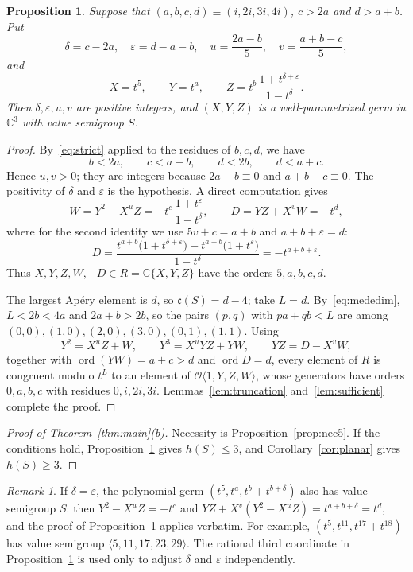 \documentclass{amsart}
\newtheorem{proposition}[theorem]{Proposition}
\theoremstyle{definition}
\theoremstyle{remark}
\newtheorem{remark}[theorem]{Remark}
\numberwithin{equation}{section}
\newcommand{\C}{\mathbb{C}}
\newcommand{\cO}{\mathcal{O}}
\newcommand{\ord}{\operatorname{ord}}
\newcommand{\cond}{\mathfrak{c}}
\newcommand{\gen}[1]{\langle #1\rangle}
\newcommand{\Os}[1]{\cO\langle #1\rangle}
\begin{document}
\begin{proposition}\label{prop:real5}
Suppose that $(a,b,c,d)\equiv(i,2i,3i,4i)$, $c>2a$ and $d>a+b$. Put
\[
\delta=c-2a,\quad \varepsilon=d-a-b,\quad u=\frac{2a-b}{5},\quad v=\frac{a+b-c}{5},
\]
and
\[
X=t^5,\qquad Y=t^a,\qquad Z=t^b\,\frac{1+t^{\delta+\varepsilon}}{1-t^\delta}.
\]
Then $\delta,\varepsilon,u,v$ are positive integers, and $(X,Y,Z)$ is a well-parametrized germ in $\C^3$ with value semigroup $S$.
\end{proposition}

\begin{proof}
By~\eqref{eq:strict} applied to the residues of $b,c,d$, we have
\begin{equation}\label{eq:mededim}
b<2a,\qquad c<a+b,\qquad d<2b,\qquad d<a+c.
\end{equation}
Hence $u,v>0$; they are integers because $2a-b\equiv0$ and $a+b-c\equiv0$. The positivity of $\delta$ and $\varepsilon$ is the hypothesis. A direct computation gives
\begin{equation}\label{eq:ident5}
W=Y^2-X^uZ=-t^c\,\frac{1+t^\varepsilon}{1-t^\delta},\qquad D=YZ+X^vW=-t^d,
\end{equation}
where for the second identity we use $5v+c=a+b$ and $a+b+\varepsilon=d$:
\[
D=\frac{t^{a+b}\bigl(1+t^{\delta+\varepsilon}\bigr)-t^{a+b}\bigl(1+t^{\varepsilon}\bigr)}{1-t^\delta}=-t^{a+b+\varepsilon}.
\]
Thus $X,Y,Z,W,-D\in R=\C\{X,Y,Z\}$ have the orders $5,a,b,c,d$.

The largest Ap\'ery element is $d$, so $\cond(S)=d-4$; take $L=d$. By~\eqref{eq:mededim}, $L<2b<4a$ and $2a+b>2b$, so the pairs $(p,q)$ with $pa+qb<L$ are among $(0,0),(1,0),(2,0),(3,0),(0,1),(1,1)$. Using
\[
Y^2=X^uZ+W,\qquad Y^3=X^uYZ+YW,\qquad YZ=D-X^vW,
\]
together with $\ord(YW)=a+c>d$ and $\ord D=d$, every element of $R$ is congruent modulo $t^L$ to an element of $\Os{1,Y,Z,W}$, whose generators have orders $0,a,b,c$ with residues $0,i,2i,3i$. Lemmas~\ref{lem:truncation} and~\ref{lem:sufficient} complete the proof.
\end{proof}

\begin{proof}[Proof of Theorem~\textup{\ref{thm:main}(b)}]
Necessity is Proposition~\ref{prop:nec5}. If the conditions hold, Proposition~\ref{prop:real5} gives $h(S)\le3$, and Corollary~\ref{cor:planar} gives $h(S)\ge3$.
\end{proof}

\begin{remark}\label{rem:polynomial}
If $\delta=\varepsilon$, the polynomial germ $(t^5,t^a,t^b+t^{b+\delta})$ also has value semigroup $S$: then $Y^2-X^uZ=-t^c$ and $YZ+X^v(Y^2-X^uZ)=t^{a+b+\delta}=t^d$, and the proof of Proposition~\ref{prop:real5} applies verbatim. For example, $(t^5,t^{11},t^{17}+t^{18})$ has value semigroup $\gen{5,11,17,23,29}$. The rational third coordinate in Proposition~\ref{prop:real5} is used only to adjust $\delta$ and $\varepsilon$ independently.
\end{remark}
\end{document}
